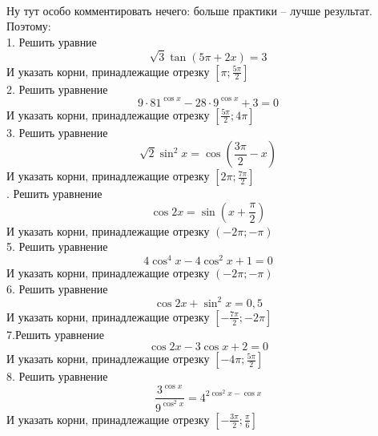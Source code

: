 \documentclass{article}
\begin{document}
\paragraph{}
Ну тут особо комментировать нечего: больше практики -- лучше результат. Поэтому: \\
1. Решить уравние 
\[ \sqrt{3}\tan(5\pi + 2x) = 3\]
И указать корни, принадлежащие отрезку \( [\pi; \frac{5\pi}{2}] \) \\
2. Решить уравнение
\[ 9 \cdot 81^{\cos x} - 28 \cdot 9^{\cos x} + 3 = 0 \]
И указать корни, принадлежащие отрезку \( [\frac{5\pi}{2}; 4\pi] \) \\
3. Решить уравнение
\[ \sqrt{2}\sin^2 x = \cos\left( \frac{3\pi}{2} - x\right) \]
И указать корни, принадлежащие отрезку \( [2\pi; \frac{7\pi}{2}] \) \\
. Решить уравнение 
\[\cos 2x = \sin\left( x + \frac{\pi}{2}\right)\]
И указать корни, принадлежащие отрезку \( (-2\pi; -\pi)\) \\
5. Решить уравнение
\[ 4 \cos^4 x - 4\cos^2 x + 1 = 0 \]
И указать корни, принадлежащие отрезку \( (-2\pi; -\pi) \) \\
6. Решить уравнение
\[ \cos 2x + \sin^2 x = 0,5 \]
И указать корни, принадлежащие отрезку \( [-\frac{7\pi}{2}; -2\pi] \) \\
 7.Решить уравнение
\[ \cos 2x -3\cos x + 2 = 0 \]
И указать корни, принадлежащие отрезку \( [-4\pi; \frac{5\pi}{2}] \) \\
8. Решить уравнение
\[ \frac{3^{\cos x}}{9^{\cos^2 x}} = 4^{2 \cos^2 x - \cos x} \]
И указать корни, принадлежащие отрезку \( [-\frac{3\pi}{2}; \frac{\pi}{6}] \) \\
\end{document}
